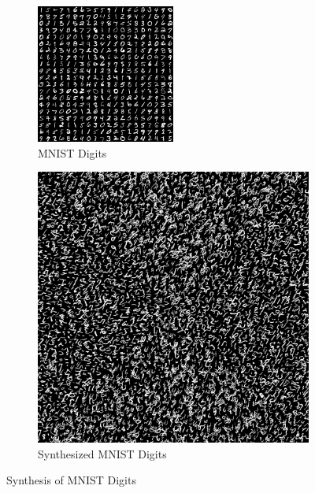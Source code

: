 \documentclass{article}
\begin{document}
\begin{figure}[htbp!]
    \centering
    \begin{subfigure}[b]{0.49\textwidth}
        \centering
        \includegraphics[width=0.5\textwidth]{../Code/Textures/mnist.png}
        \caption{MNIST Digits}
        \label{fig:original-mnist}
    \end{subfigure}
    \hfill %
    \begin{subfigure}[b]{0.49\textwidth}
        \centering
        \includegraphics[width=\textwidth]{../Result/mnist.png}
        \caption{Synthesized MNIST Digits}
        \label{fig:synthesized-mnist}
    \end{subfigure}
    \caption{Synthesis of MNIST Digits}
    \label{fig:synthesis-mnist}
\end{figure}
\end{document}
